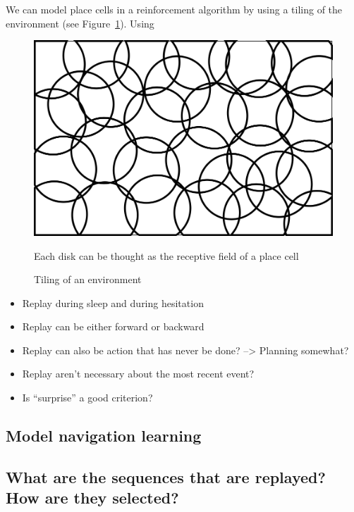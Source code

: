 \documentclass[]{article}
\begin{document}
We can model place cells in a reinforcement algorithm by using a tiling of the environment (see Figure~\ref{tiling_schema}). Using

\begin{figure}
  {\centering
  \includegraphics[width=0.7\linewidth]{images/schema_tiling.png}
  \caption{Tiling of an environment}\label{tiling_schema}
  \par}
  \small{Each disk can be thought as the receptive field of a place cell}
\end{figure}

\begin{itemize}
\item Replay during sleep and during hesitation
\item Replay can be either forward or backward
\item Replay can also be action that has never be done? --> Planning somewhat?
\item Replay aren't necessary about the most recent event?
\item Is ``surprise'' a good criterion?
\end{itemize}

\cite{gupta_hippocampal_2010}

\subsection{Model navigation learning}\label{model-navigation-learning}



\subsection{What are the sequences that are replayed? How are they
selected?}\label{what-are-the-sequences-that-are-replayed-how-are-they-selected}
\end{document}
